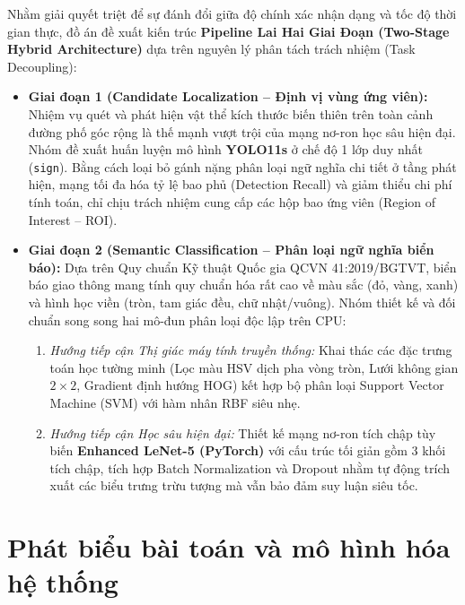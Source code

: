 \documentclass[a4paper, 11pt]{article}
\begin{document}
Nhằm giải quyết triệt để sự đánh đổi giữa độ chính xác nhận dạng và tốc độ thời gian thực, đồ án đề xuất kiến trúc \textbf{Pipeline Lai Hai Giai Đoạn (Two-Stage Hybrid Architecture)} dựa trên nguyên lý phân tách trách nhiệm (Task Decoupling):

\begin{itemize}
    \item \textbf{Giai đoạn 1 (Candidate Localization -- Định vị vùng ứng viên):} Nhiệm vụ quét và phát hiện vật thể kích thước biến thiên trên toàn cảnh đường phố góc rộng là thế mạnh vượt trội của mạng nơ-ron học sâu hiện đại. Nhóm đề xuất huấn luyện mô hình \textbf{YOLO11s} ở chế độ 1 lớp duy nhất (\texttt{sign}). Bằng cách loại bỏ gánh nặng phân loại ngữ nghĩa chi tiết ở tầng phát hiện, mạng tối đa hóa tỷ lệ bao phủ (Detection Recall) và giảm thiểu chi phí tính toán, chỉ chịu trách nhiệm cung cấp các hộp bao ứng viên (Region of Interest -- ROI).
    \item \textbf{Giai đoạn 2 (Semantic Classification -- Phân loại ngữ nghĩa biển báo):} Dựa trên Quy chuẩn Kỹ thuật Quốc gia QCVN 41:2019/BGTVT, biển báo giao thông mang tính quy chuẩn hóa rất cao về màu sắc (đỏ, vàng, xanh) và hình học viền (tròn, tam giác đều, chữ nhật/vuông). Nhóm thiết kế và đối chuẩn song song hai mô-đun phân loại độc lập trên CPU:
    \begin{enumerate}
        \item \textit{Hướng tiếp cận Thị giác máy tính truyền thống:} Khai thác các đặc trưng toán học tường minh (Lọc màu HSV dịch pha vòng tròn, Lưới không gian $2 \times 2$, Gradient định hướng HOG) kết hợp bộ phân loại Support Vector Machine (SVM) với hàm nhân RBF siêu nhẹ.
        \item \textit{Hướng tiếp cận Học sâu hiện đại:} Thiết kế mạng nơ-ron tích chập tùy biến \textbf{Enhanced LeNet-5 (PyTorch)} với cấu trúc tối giản gồm 3 khối tích chập, tích hợp Batch Normalization và Dropout nhằm tự động trích xuất các biểu trưng trừu tượng mà vẫn bảo đảm suy luận siêu tốc.
    \end{enumerate}
\end{itemize}

\section{Phát biểu bài toán và mô hình hóa hệ thống}
\label{sec:phat_bieu_bai_toan}
\end{document}
